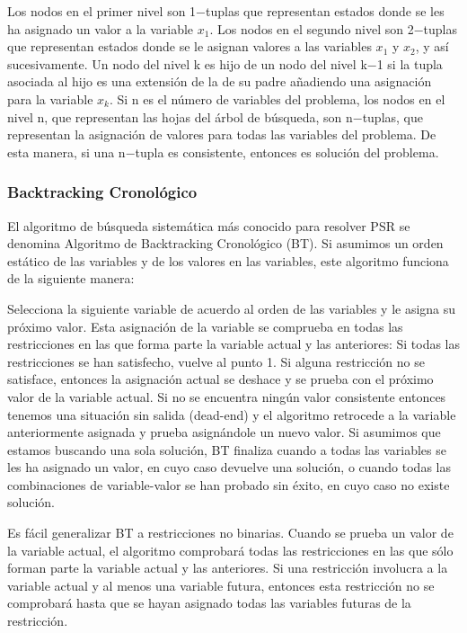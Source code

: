 \documentclass[a4paper]{article}
\begin{document}
Los nodos en el primer nivel son 1−tuplas que representan estados donde se les ha asignado un valor a la variable $x_1$. Los nodos en el segundo nivel son 2−tuplas que representan estados donde se le asignan valores a las variables $x_1$ y $x_2$, y así sucesivamente. Un nodo del nivel k es hijo de un nodo del nivel k−1 si la tupla asociada al hijo es una extensión de la de su padre añadiendo una asignación para la variable $x_k$. Si n es el número de variables del problema, los nodos en el nivel n, que representan las hojas del árbol de búsqueda, son n−tuplas, que representan la asignación de valores para todas las variables del problema. De esta manera, si una n−tupla es consistente, entonces es solución del problema.


\subsubsection*{Backtracking Cronológico}

El algoritmo de búsqueda sistemática más conocido para resolver PSR se denomina Algoritmo de Backtracking Cronológico (BT). Si asumimos un orden estático de las variables y de los valores en las variables, este algoritmo funciona de la siguiente manera:

Selecciona la siguiente variable de acuerdo al orden de las variables y le asigna su próximo valor. 
Esta asignación de la variable se comprueba en todas las restricciones en las que forma parte la variable actual y las anteriores:
Si todas las restricciones se han satisfecho, vuelve al punto 1.
Si alguna restricción no se satisface, entonces la asignación actual se deshace y se prueba con el próximo valor de la variable actual. 
Si no se encuentra ningún valor consistente entonces tenemos una situación sin salida (dead-end) y el algoritmo retrocede a la variable anteriormente asignada y prueba asignándole un nuevo valor.
Si asumimos que estamos buscando una sola solución, BT finaliza cuando a todas las variables se les ha asignado un valor, en cuyo caso devuelve una solución, o cuando todas las combinaciones de variable-valor se han probado sin éxito, en cuyo caso no existe solución.

Es fácil generalizar BT a restricciones no binarias. Cuando se prueba un valor de la variable actual, el algoritmo comprobará todas las restricciones en las que sólo forman parte la variable actual y las anteriores. Si una restricción involucra a la variable actual y al menos una variable futura, entonces esta restricción no se comprobará hasta que se hayan asignado todas las variables futuras de la restricción.
\end{document}
